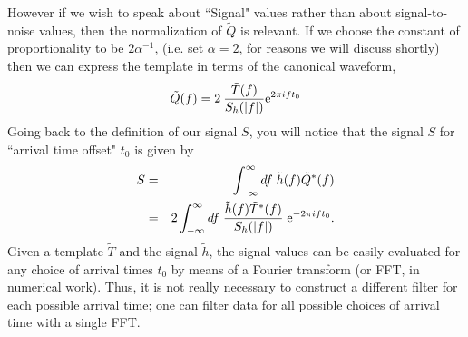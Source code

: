 However if we wish to speak about ``Signal" values rather than about
signal-to-noise values, then the normalization of $\tilde Q$ is relevant.
If we choose the constant of proportionality to be $2 \alpha^{-1}$,
(i.e. set $\alpha = 2$, for reasons we will discuss shortly) then we
can express the template in terms of the canonical waveform,
\begin{equation}
\label{e:optimal}
        \tilde{Q}(f)=2 \> \frac{\tilde{T}(f)}{S_h(|f|)} {\rm e}^{2\pi i f t_0}
\end{equation}
Going back to the definition of our signal $S$, you will notice that the
signal $S$ for ``arrival time offset" $t_0$ is given by
\begin{eqnarray}
\nonumber
S &=& \int_{-\infty}^\infty df \; \tilde h(f) \tilde Q^* (f) \\
\label{e:lag}
  &=& 2 \int_{-\infty}^\infty df \; { \tilde h(f) \tilde T^* (f) 
\over S_h(|f|)} \; {\rm e}^{- 2 \pi i f t_0}.
\end{eqnarray}
Given a template $\tilde T$ and the signal $\tilde h$, the signal
values can be easily evaluated for any choice of arrival times $t_0$ by
means of a Fourier transform (or FFT, in numerical work).  Thus, it is
not really necessary to construct a different filter for each possible
arrival time; one can filter data for all possible choices of arrival
time with a single FFT.

